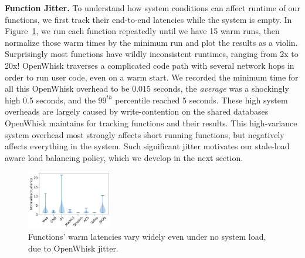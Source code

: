 \noindent \textbf{Function Jitter.}
To understand how system conditions can affect runtime of our functions, we first track their end-to-end latencies while the system is empty. 
In Figure~\ref{fig:UnstableEmpty}, we run each function repeatedly until we have 15 warm runs, then normalize those warm times by the minimum run and plot the results as a violin.
Surprisingly most functions have wildly inconsistent runtimes, ranging from 2x to 20x!
OpenWhisk traverses a complicated code path with several network hops in order to run user code, even on a warm start. 
We recorded the minimum time for all this OpenWhisk overhead to be $0.015$ seconds, the \emph{average} was a shockingly high 0.5 seconds, and the $99^{th}$ percentile reached 5 seconds. 
These high system overheads are largely caused by write-contention on the shared databases OpenWhisk maintains for tracking functions and their results. 
This high-variance system overhead  most strongly affects short running functions, but negatively affects everything in the system.
Such significant jitter motivates our stale-load aware load balancing policy, which we develop in the next section. 



\begin{figure}
  \includegraphics[width=0.33\textwidth]{../figs/ow/function_breakdown_min.pdf}
  \caption{Functions' warm latencies vary widely even under no system load, due to OpenWhisk jitter.}
  \label{fig:UnstableEmpty}
\end{figure}


